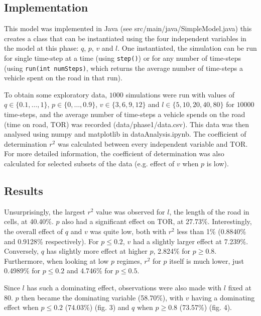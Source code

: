 \documentclass{article}
\begin{document}
\subsection*{Implementation}

This model was implemented in Java (see src/main/java/SimpleModel.java) this creates a class that can be instantiated using the four independent variables in the model at this phase: $q$, $p$, $v$ and $l$. One instantiated, the simulation can be run for single time-step at a time (using \texttt{step()}) or for any number of time-steps (using \texttt{run(int numSteps)}, which returns the average number of time-steps a vehicle spent on the road in that run).

To obtain some exploratory data, $1000$ simulations were run with values of $q \in \{0.1, \dots , 1\}$, $p \in \{0, \dots , 0.9\}$, $v \in \{3, 6, 9, 12\}$ and $l \in \{5, 10, 20, 40, 80\}$ for $10000$ time-steps, and the average number of time-steps a vehicle spends on the road (time on road, TOR) was recorded (data/phase1/data.csv). This data was then analysed using numpy and matplotlib in dataAnalysis.ipynb. The coefficient of determination $r^{2}$ was calculated between every independent variable and TOR. For more detailed information, the coefficient of determination was also calculated for selected subsets of the data (e.g. effect of $v$ when $p$ is low).

\subsection*{Results}

Unsurprisingly, the largest $r^{2}$ value was observed for $l$, the length of the road in cells, at 40.40\%. $p$ also had a significant effect on TOR, at 27.73\%. Interestingly, the overall effect of $q$ and $v$ was quite low, both with $r^{2}$ less than 1\% (0.8840\% and 0.9128\% respectively). For $p \leq 0.2$, $v$ had a slightly larger effect at 7.239\%. Conversely, $q$ has slightly more effect at higher $p$, 2.824\% for $p \geq 0.8$. Furthermore, when looking at low $p$ regimes, $r^{2}$ for $p$ itself is much lower, just 0.4989\% for $p \leq 0.2$ and 4.746\% for $p \leq 0.5$.

Since $l$ has such a dominating effect, observations were also made with $l$ fixed at 80. $p$ then became the dominating variable (58.70\%), with $v$ having a dominating effect when $p \leq 0.2$ (74.03\%) (fig. 3) and $q$ when $p \geq 0.8$ (73.57\%) (fig. 4).
\end{document}
